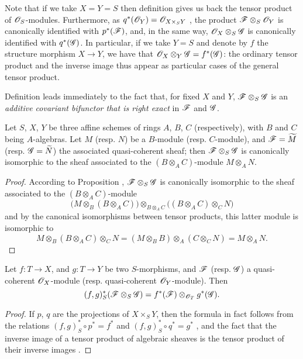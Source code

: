 Note that if we take $X=Y=S$ then definition  gives us back the tensor
product of $\mathscr{O}_S$-modules. Furthermore, as $q^*(\mathscr{O}_Y)=\mathscr{O}_{X\times_S Y}$
, the product $\mathscr{F}\otimes_S\mathscr{O}_Y$ is canonically
identified with $p^*(\mathscr{F})$, and, in the same way,
$\mathscr{O}_X\otimes_S\mathscr{G}$ is canonically identified with $q^*(\mathscr{G})$. In
particular, if we take $Y=S$ and denote by $f$ the structure morphism $X\to Y$,
we have that $\mathscr{O}_X\otimes_Y\mathscr{G}=f^*(\mathscr{G})$: the ordinary tensor
product and the inverse image thus appear as particular cases of the general
tensor product.

Definition  leads immediately to the fact that, for fixed $X$ and
$Y$, $\mathscr{F}\otimes_S\mathscr{G}$ is an \emph{additive covariant bifunctor that
is right exact} in $\mathscr{F}$ and $\mathscr{G}$.

\begin{prop}[9.1.3]
\label{1.9.1.3}
Let $S$, $X$, $Y$ be three affine schemes of rings
$A$, $B$, $C$ (respectively), with $B$ and $C$ being $A$-algebras. Let $M$
(resp. $N$) be a $B$-module (resp. $C$-module), and
$\mathscr{F}={\widetilde{M}}$ (resp. $\mathscr{G}={\widetilde{N}}$) the
associated quasi-coherent sheaf; then $\mathscr{F}\otimes_S\mathscr{G}$ is
canonically isomorphic to the sheaf associated to the $(B\otimes_A C)$-module
$M\otimes_A N$.
\end{prop}

\begin{proof}
\label{proof-1.9.1.3}
According to Proposition , $\mathscr{F}\otimes_S\mathscr{G}$
is canonically isomorphic to the sheaf associated to the $(B\otimes_A C)$-module
\[
  \big(M\otimes_B(B\otimes_A C)\big)\otimes_{B\otimes_A C}\big((B\otimes_A C)\otimes_C N\big)
\]
and by the canonical isomorphisms between tensor
products, this latter module is isomorphic to
\[
  M\otimes_B(B\otimes_A C)\otimes_C N=(M\otimes_B B)\otimes_A(C\otimes_C N)=M\otimes_A N.
\]
\end{proof}

\begin{prop}[9.1.4]
\label{1.9.1.4}
Let $f:T\to X$, and $g:T\to Y$ be
two $S$-morphisms, and $\mathscr{F}$ (resp. $\mathscr{G}$) a quasi-coherent
$\mathscr{O}_X$-module (resp. quasi-coherent $\mathscr{O}_Y$-module). Then
\[
  (f,g)^*_S(\mathscr{F}\otimes_S\mathscr{G})=f^*(\mathscr{F})\otimes_{\mathscr{O}_T}g^*(\mathscr{G}).
\]
\end{prop}

\begin{proof}
\label{proof-1.9.14}
If $p$, $q$ are the projections of $X\times_S Y$, then the formula in fact follows
from the relations $(f,g)^*_S\circ p^*=f^*$ and
$(f,g)^*_S\circ q^*=g^*$ , and the fact that the inverse
image of a tensor product of algebraic sheaves is the tensor product of their inverse
images .
\end{proof}

